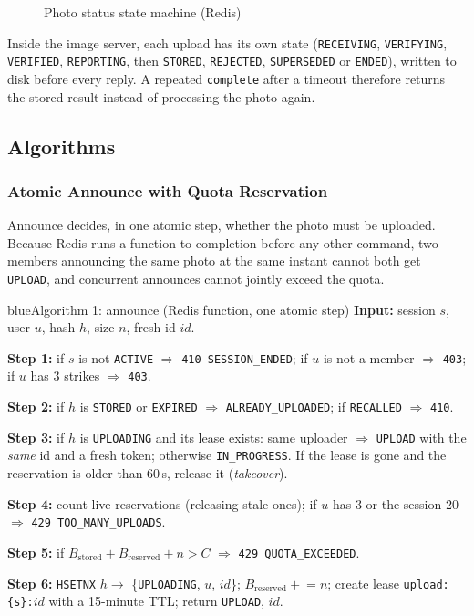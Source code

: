 \begin{figure}[H]
\centering
{}
\caption{Photo status state machine (Redis)}\label{fig:photofsm}
\end{figure}

Inside the image server, each upload has its own state (\texttt{RECEIVING}, \texttt{VERIFYING}, \texttt{VERIFIED}, \texttt{REPORTING}, then \texttt{STORED}, \texttt{REJECTED}, \texttt{SUPERSEDED} or \texttt{ENDED}), written to disk before every reply. A repeated \texttt{complete} after a timeout therefore returns the stored result instead of processing the photo again.

\subsection{Algorithms}

\subsubsection{Atomic Announce with Quota Reservation}\label{sec:alg-announce}

Announce decides, in one atomic step, whether the photo must be uploaded. Because Redis runs a function to completion before any other command, two members announcing the same photo at the same instant cannot both get \texttt{UPLOAD}, and concurrent announces cannot jointly exceed the quota.

\begin{pbox}{blue}{Algorithm 1: announce (Redis function, one atomic step)}
\textbf{Input:} session $s$, user $u$, hash $h$, size $n$, fresh id $id$.\par
\textbf{Step 1:} if $s$ is not \texttt{ACTIVE} $\Rightarrow$ \texttt{410 SESSION\_ENDED}; if $u$ is not a member $\Rightarrow$ \texttt{403}; if $u$ has 3 strikes $\Rightarrow$ \texttt{403}.\par
\textbf{Step 2:} if $h$ is \texttt{STORED} or \texttt{EXPIRED} $\Rightarrow$ \texttt{ALREADY\_UPLOADED}; if \texttt{RECALLED} $\Rightarrow$ \texttt{410}.\par
\textbf{Step 3:} if $h$ is \texttt{UPLOADING} and its lease exists: same uploader $\Rightarrow$ \texttt{UPLOAD} with the \emph{same} id and a fresh token; otherwise \texttt{IN\_PROGRESS}. If the lease is gone and the reservation is older than 60\,s, release it (\emph{takeover}).\par
\textbf{Step 4:} count live reservations (releasing stale ones); if $u$ has 3 or the session 20 $\Rightarrow$ \texttt{429 TOO\_MANY\_UPLOADS}.\par
\textbf{Step 5:} if $B_\text{stored} + B_\text{reserved} + n > C$ $\Rightarrow$ \texttt{429 QUOTA\_EXCEEDED}.\par
\textbf{Step 6:} \texttt{HSETNX} $h \to$ \{\texttt{UPLOADING}, $u$, $id$\}; $B_\text{reserved} \mathrel{+}= n$; create lease \texttt{upload:\{s\}:$id$} with a 15-minute TTL; return \texttt{UPLOAD}, $id$.
\end{pbox}

